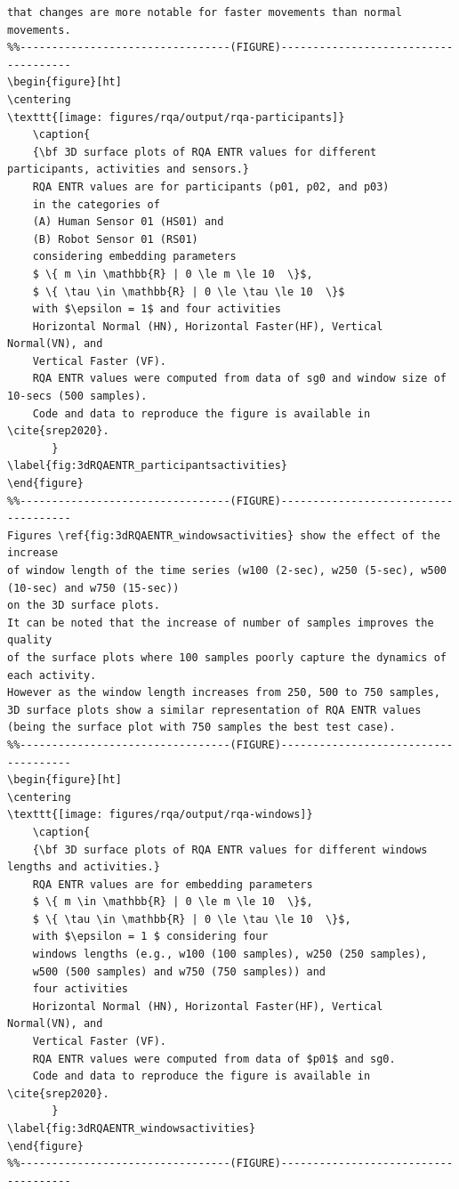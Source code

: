 \documentclass[10pt]{article}
\begin{document}
\begin{enumerate}
\begin{verbatim}
that changes are more notable for faster movements than normal movements. 
%%---------------------------------(FIGURE)-------------------------------------
\begin{figure}[ht]
\centering
\texttt{[image: figures/rqa/output/rqa-participants]}
    \caption{
	{\bf 3D surface plots of RQA ENTR values for different participants, activities and sensors.}
	RQA ENTR values are for participants (p01, p02, and p03) 
	in the categories of 
	(A) Human Sensor 01 (HS01) and 
	(B) Robot Sensor 01 (RS01)
	considering embedding parameters
	$ \{ m \in \mathbb{R} | 0 \le m \le 10  \}$,
	$ \{ \tau \in \mathbb{R} | 0 \le \tau \le 10  \}$
	with $\epsilon = 1$ and four activities 
	Horizontal Normal (HN), Horizontal Faster(HF), Vertical Normal(VN), and 
	Vertical Faster (VF).
	RQA ENTR values were computed from data of sg0 and window size of 10-secs (500 samples).
	Code and data to reproduce the figure is available in \cite{srep2020}.
       }
\label{fig:3dRQAENTR_participantsactivities}
\end{figure}
%%---------------------------------(FIGURE)-------------------------------------
Figures \ref{fig:3dRQAENTR_windowsactivities} show the effect of the increase 
of window length of the time series (w100 (2-sec), w250 (5-sec), w500 (10-sec) and w750 (15-sec))
on the 3D surface plots. 
It can be noted that the increase of number of samples improves the quality 
of the surface plots where 100 samples poorly capture the dynamics of each activity.
However as the window length increases from 250, 500 to 750 samples, 
3D surface plots show a similar representation of RQA ENTR values 
(being the surface plot with 750 samples the best test case).
%%---------------------------------(FIGURE)-------------------------------------
\begin{figure}[ht]
\centering
\texttt{[image: figures/rqa/output/rqa-windows]}
    \caption{
	{\bf 3D surface plots of RQA ENTR values for different windows lengths and activities.}
	RQA ENTR values are for embedding parameters
	$ \{ m \in \mathbb{R} | 0 \le m \le 10  \}$,
	$ \{ \tau \in \mathbb{R} | 0 \le \tau \le 10  \}$, 
	with $\epsilon = 1 $ considering four 
	windows lengths (e.g., w100 (100 samples), w250 (250 samples),
	w500 (500 samples) and w750 (750 samples)) and
	four activities 
	Horizontal Normal (HN), Horizontal Faster(HF), Vertical Normal(VN), and 
	Vertical Faster (VF).
	RQA ENTR values were computed from data of $p01$ and sg0.
	Code and data to reproduce the figure is available in \cite{srep2020}.
       }
\label{fig:3dRQAENTR_windowsactivities}
\end{figure}
%%---------------------------------(FIGURE)-------------------------------------






\end{verbatim}
\end{enumerate}
\end{document}
